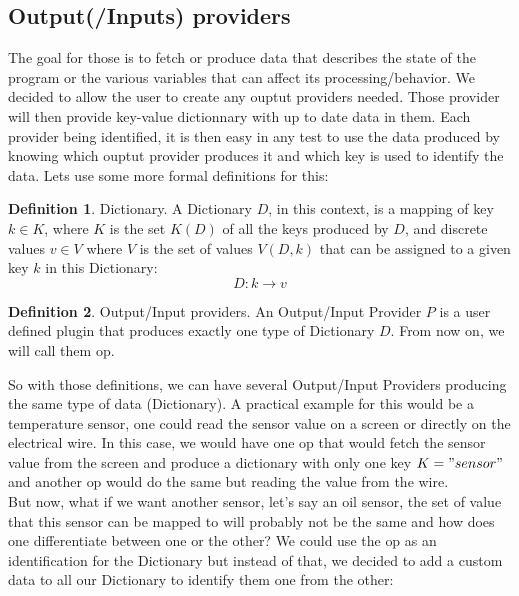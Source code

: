\documentclass[12pt]{article}
\theoremstyle{definition}
\newtheorem{definition}{Definition}[section]
\theoremstyle{definition}
\theoremstyle{remark}
\begin{document}
\subsection{Output(/Inputs) providers}\label{sec:providers}


The goal for those is to fetch or produce data that describes the state of the program or the various variables that can affect its processing/behavior. We decided to allow the user to create any ouptut providers needed. Those provider will then provide key-value dictionnary with up to date data in them. Each provider being identified, it is then easy in any test to use the data produced by knowing which ouptut provider produces it and which key is used to identify the data. Lets use some more formal definitions for this:

\theoremstyle{definition}
\begin{definition}{Dictionary.} A Dictionary $D$, in this context, is a mapping of key $k \in K$, where $K$ is the set $K(D)$ of all the keys produced by $D$, and discrete values $v \in V$ where $V$ is the set of values $V(D, k)$ that can be assigned to a given key $k$ in this Dictionary:
$$D: k \to v$$
\end{definition}

\theoremstyle{definition}
\begin{definition}{Output/Input providers.} An Output/Input Provider $P$ is a user defined plugin that produces exactly one type of Dictionary $D$. From now on, we will call them \gls{op}.
\end{definition}

So with those definitions, we can have several Output/Input Providers producing the same type of data (Dictionary). A practical example for this would be a temperature sensor, one could read the sensor value on a screen or directly on the electrical wire. In this case, we would have one \gls{op} that would fetch the sensor value from the screen and produce a dictionary with only one key $K = { "sensor" }$ and another \gls{op} would do the same but reading the value from the wire.\\

But now, what if we want another sensor, let's say an oil sensor, the set of value that this sensor can be mapped to will probably not be the same and how does one differentiate between one or the other? We could use the \gls{op} as an identification for the Dictionary but instead of that, we decided to add a custom data to all our Dictionary to identify them one from the other:
\end{document}
